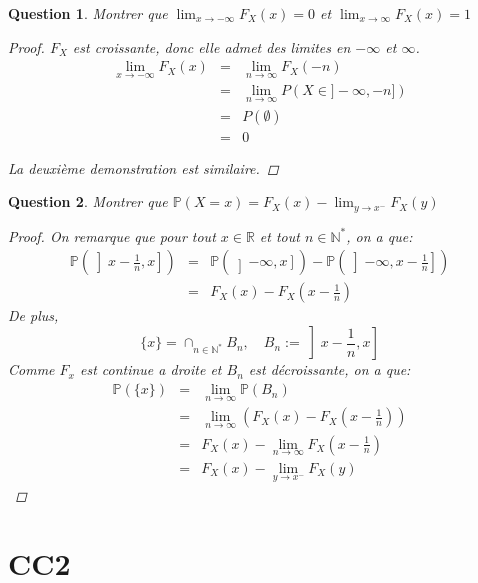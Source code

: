\documentclass{article}
\theoremstyle{plain}
\newtheorem{question}{Question}
\theoremstyle{definition}
\begin{document}
\begin{question}
	Montrer que $\lim_{x \to -\infty} F_X (x) = 0$ et $\lim_{x \to \infty} F_X (x) = 1$
	\begin{proof}
		$F_X$ est croissante, donc elle admet des limites en $-\infty$ et $\infty$.
		\begin{eqnarray*}
			\lim_{x \to -\infty} F_X (x) &=& \lim_{n \to \infty} F_X (-n) \\
			&=& \lim_{n \to \infty} P (X \in ]-\infty, -n]) \\
			&=& P (\emptyset) \\
			&=& 0
		\end{eqnarray*}

		La deuxième demonstration est similaire.
	\end{proof}
\end{question}



\begin{question}
	Montrer que $\mathbb{P} (X = x) = F_X (x) - \lim_{y \to x^-} F_X (y)$
	\begin{proof}
		On remarque que pour tout $x \in \mathbb{R}$ et tout $n \in \mathbb{N}^*$, on a que:
		\begin{eqnarray*}
			\mathbb{P} \left(\left] x- \frac{1}{n}, x \right]\right) &=& \mathbb{P} \left(\left] -\infty, x  \right]\right) - \mathbb{P} \left(\left] -\infty, x- \frac{1}{n} \right]\right) \\
			&=& F_X (x) - F_X (x- \frac{1}{n})
		\end{eqnarray*}
		De plus,
		$$ \{x\} = \cap_{n \in \mathbb{N}^*} B_n, \quad B_n := \left] x- \frac{1}{n}, x \right]$$
		Comme $F_x$ est continue a droite et $B_n$ est décroissante, on a que:
		\begin{eqnarray*}
			\mathbb{P} (\{x\}) &=& \lim_{n \to \infty} \mathbb{P} (B_n) \\
			&=& \lim_{n \to \infty} \left( F_X (x) - F_X (x- \frac{1}{n}) \right) \\
			&=& F_X (x) - \lim_{n \to \infty} F_X (x- \frac{1}{n}) \\
			&=& F_X (x) - \lim_{y \to x^-} F_X (y)
		\end{eqnarray*}

	\end{proof}
\end{question}

\section{CC2}
\end{document}
